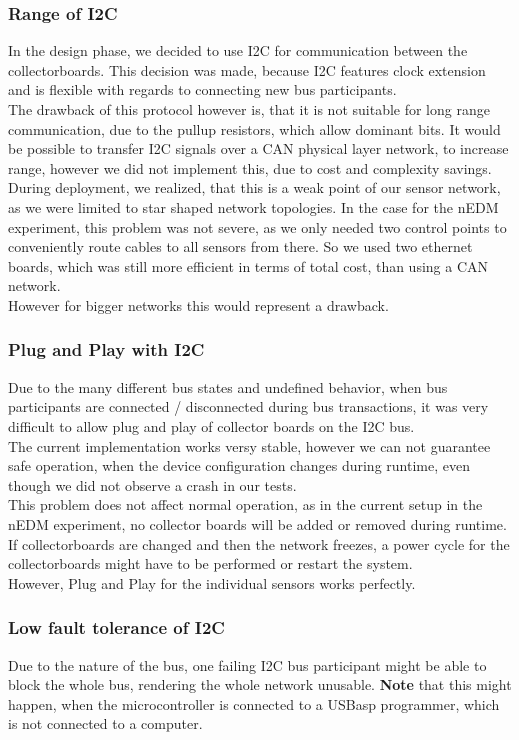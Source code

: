 \documentclass[a4paper]{scrreprt}
\begin{document}
\subsubsection{Range of I2C}
In the design phase, we decided to use I2C for communication between
the collectorboards. This decision was made, because I2C features clock
extension and is flexible with regards to connecting new bus participants.\\
The drawback of this protocol however is, that it is not suitable for long
range communication, due to the pullup resistors, which allow dominant
bits. It would be possible to transfer I2C signals over a CAN physical layer
network, to increase range, however we did not implement this, due to
cost and complexity savings.\\
During deployment, we realized, that this is a weak point of our sensor
network, as we were limited to star shaped network topologies. In the case
for the nEDM experiment, this problem was not severe, as we only needed
two control points to conveniently route cables to all sensors from there.
So we used two ethernet boards, which was still more efficient in terms
of total cost, than using a CAN network.\\
However for bigger networks this would represent a drawback.
\subsubsection{Plug and Play with I2C}
Due to the many different bus states and undefined behavior, when bus
participants are connected / disconnected during bus transactions, it was
very difficult to allow plug and play of collector boards on the I2C bus.\\
The current implementation works versy stable, however we can not guarantee
safe operation, when the device configuration changes during runtime, even though
we did not observe a crash in our tests.\\
This problem does not affect normal operation, as in the current setup in the
nEDM experiment, no collector boards will be added or removed during runtime.
If collectorboards are changed and then the network freezes, a power cycle for the collectorboards might have to be performed or restart the system.
\\
However, Plug and Play for the individual sensors works perfectly.
\subsubsection{Low fault tolerance of I2C}
Due to the nature of the bus, one failing I2C bus participant might be able to
block the whole bus, rendering the whole network unusable.
\textbf{Note} that this
might happen, when the microcontroller is connected to a USBasp programmer,
which is not connected to a computer.
\end{document}
